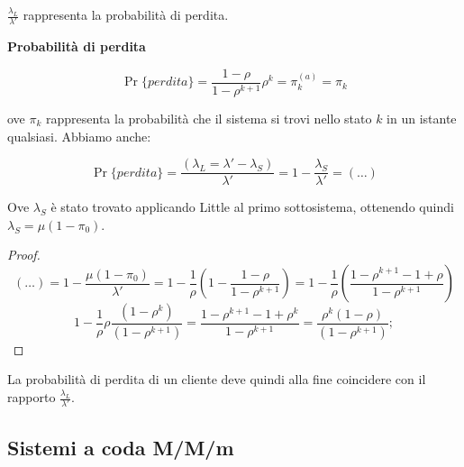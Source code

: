 \begin{itemize}
$\frac{\lambda_L}{\lambda'}$ rappresenta la probabilità di perdita.

\begin{thrm}{\textbf{Probabilità di perdita}}

\[
	\Pr\{perdita\} = \frac{1-\rho}{1-\rho^{k+1}}\rho^k = \pi_k^{(a)} = \pi_k
\]

ove $\pi_k$ rappresenta la probabilità che il sistema si trovi nello stato $k$ in un istante qualsiasi. Abbiamo anche:

\[
	\Pr\{perdita\} = \frac{(\lambda_L = \lambda'-\lambda_S)}{\lambda'} = 1-\frac{\lambda_S}{\lambda'} = (\dots)
\]
\end{thrm}

Ove $\lambda_S$ è stato trovato applicando Little al primo sottosistema, ottenendo quindi $\lambda_S =\mu(1-\pi_0)$.

\begin{proof}

\[
	(\dots) = 1-\frac{\mu(1-\pi_0)}{\lambda'} = 1-\frac{1}{\rho}(1-\frac{1-\rho}{1-\rho^{k+1}}) = 1-\frac{1}{\rho}(\frac{1-\rho^{k+1}-1+\rho}{1-\rho^{k+1}})
\]
\[
	1-\frac{1}{\rho}\rho \frac{(1-\rho^k)}{(1-\rho^{k+1})} = \frac{1-\rho^{k+1}-1+\rho^k}{1-\rho^{k+1}} = \frac{\rho^k(1-\rho)}{(1-\rho^{k+1})};
\]

\end{proof}

La probabilità di perdita di un cliente deve quindi alla fine coincidere con il rapporto $\frac{\lambda_L}{\lambda'}$.

\end{itemize}

\subsection{Sistemi a coda M/M/m}

